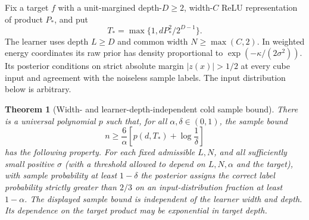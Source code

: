 \documentclass[11pt]{article}
\newtheorem{theorem}{Theorem}
\theoremstyle{remark}\newtheorem{remark}[theorem]{Remark}
\begin{document}
Fix a target $f$ with a unit-margined depth-$D\ge2$, width-$C$ ReLU
representation of product $P_*$, and put
\[
 T_* =\max\{1,dP_*^2/2^{D-1}\}.
\]
The learner uses depth $L\ge D$ and common width $N\ge\max(C,2)$.
In weighted energy coordinates its raw prior has density proportional to
$\exp(-\kappa/(2\sigma^2))$. Its posterior conditions on strict absolute
margin $|z(x)|>1/2$ at every cube input and agreement with the noiseless
sample labels. The input distribution below is arbitrary.

\begin{theorem}[Width- and learner-depth-independent cold sample bound]
\label{thm:occam}
There is a universal polynomial $p$ such that, for all
$\alpha,\delta\in(0,1)$, the sample bound
\[
 n\ge\frac6\alpha\left[p(d,T_*)+\log\frac1\delta\right]
\]
has the following property. For each fixed admissible $L,N$, and all
sufficiently small positive $\sigma$ (with a threshold allowed to depend
on $L,N,\alpha$ and the target), with sample probability at least $1-\delta$
the posterior assigns the correct label probability strictly greater than
$2/3$ on an input-distribution fraction at least $1-\alpha$.
The displayed sample bound is independent of the learner width and depth.
Its dependence on the target product may be exponential in target depth.
\end{theorem}
\end{document}
